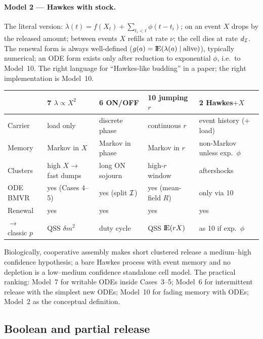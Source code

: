 \paragraph{Model 2 --- Hawkes with stock.} The literal version:
$\lambda(t)=f(X_t)+\sum_{t_i<t}\phi(t-t_i)$; on an event $X$ drops by the
released amount; between events $X$ refills at rate $\nu$; the cell dies at
rate $d_{\mathcal{I}}$. The renewal form is always well-defined
($g(a)={\rm I}\!{\rm E}(\lambda(a)\mid\text{alive})$), typically numerical; an ODE
form exists only after reduction to exponential $\phi$, i.e.\ to
Model~10. The right language for ``Hawkes-like budding'' in a paper; the
right implementation is Model~10.

\begin{center}
\renewcommand{\arraystretch}{1.2}
\small
\begin{tabular}{@{}p{}p{}p{}p{}p{}@{}}
\toprule
 & \textbf{7} $\lambda\propto X^2$ & \textbf{6} ON/OFF & \textbf{10} jumping $r$ & \textbf{2} Hawkes$+X$ \\
\midrule
Carrier & load only & discrete phase & continuous $r$ & event history ($+$load) \\
Memory & Markov in $X$ & Markov in phase & Markov in $r$ & non-Markov unless exp.\ $\phi$ \\
Clusters & high $X\to$ fast dumps & long ON sojourn & high-$r$ window & aftershocks \\
ODE BMVR & yes (Cases 4--5) & yes (split $\mathcal{I}$) & yes (mean-field $R$) & only via 10 \\
Renewal & yes & yes & yes & yes \\
$\to$ classic $p$ & QSS $\delta m^2$ & duty cycle & QSS ${\rm I}\!{\rm E}(rX)$ & as 10 if exp.\ $\phi$ \\
\bottomrule
\end{tabular}
\end{center}
Biologically, cooperative assembly makes short clustered release a
medium--high confidence hypothesis; a bare Hawkes process with event memory
and no depletion is a low--medium confidence standalone cell model. The
practical ranking: Model~7 for writable ODEs inside Cases~3--5; Model~6 for
intermittent release with the simplest new ODEs; Model~10 for fading memory
with ODEs; Model~2 as the conceptual definition.

\subsection{Boolean and partial release}
\label{sec:boolean}

